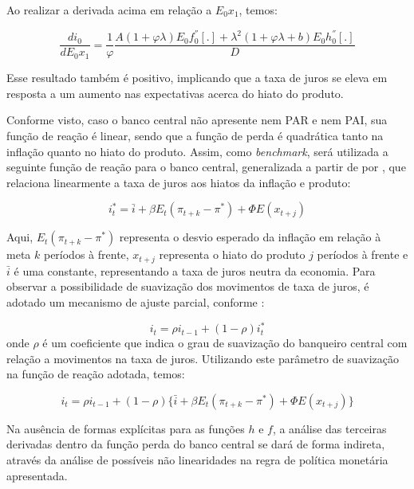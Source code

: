 \documentclass[
	article,			%
	11pt,				%
	oneside,			%
	a4paper,			%
	english,			%
	brazil,				%
	]{abntex2}
\begin{document}
	Ao realizar a derivada acima em relação a $E_0x_1$, temos:
	
	\begin{equation}
		\frac{di_0}{d E_0 x_1} = \frac{1}{\varphi} \frac{A (1 + \varphi \lambda ) E_0 f_0^{''}[.] + \lambda^2(1 + \varphi\lambda + b)E_0h_0^{''}[.]}{D} 
	\end{equation}
	
	Esse resultado também é positivo, implicando que a taxa de juros se eleva em resposta a um aumento nas expectativas acerca do hiato do produto.
	
	Conforme visto, caso o banco central não apresente nem PAR e nem PAI, sua função de reação é linear, sendo que a função de perda é quadrática tanto na inflação quanto no hiato do produto. Assim, como \textit{benchmark}, será utilizada a seguinte função de reação para o banco central, generalizada a partir de  por , que relaciona linearmente a taxa de juros aos hiatos da inflação e produto:
	
	\begin{equation}
		i_t^* = \bar{i} + \beta E_t(\pi_{t+k} - \pi^*) + \Phi E(x_{t+j})
	\end{equation}
	
	Aqui, $E_t(\pi_{t+k} - \pi^*)$ representa o desvio esperado da inflação em relação à meta $k$ períodos à frente, $x_{t+j}$ representa o hiato do produto $j$ períodos à frente e $\bar{i}$ é uma constante, representando a taxa de juros neutra da economia. Para observar a possibilidade de suavização dos movimentos de taxa de juros, é adotado um mecanismo de ajuste parcial, conforme :
		
	\begin{equation}
		i_t = \rho i_{t-1} + (1-\rho) i_t^*
	\end{equation}
	onde $\rho$ é um coeficiente que indica o grau de suavização do banqueiro central com relação a movimentos na taxa de juros. Utilizando este parâmetro de suavização na função de reação adotada, temos:
	
	\begin{equation} \label{linear}
		i_t = \rho i_{t-1} + (1-\rho) \{ \bar{i} + \beta E_t(\pi_{t+k} - \pi^*) + \Phi E(x_{t+j}) \}
	\end{equation}
		
	 Na ausência de formas explícitas para as funções $h$ e $f$, a análise das terceiras derivadas dentro da função perda do banco central se dará de forma indireta, através da análise de possíveis não linearidades na regra de política monetária apresentada.  
	
\end{document}
